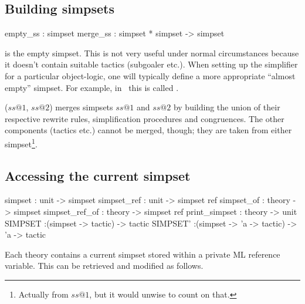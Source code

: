 \subsection{Building simpsets}
\begin{ttbox}
empty_ss : simpset
merge_ss : simpset * simpset -> simpset
\end{ttbox}
\begin{ttdescription}
  
\item[\ttindexbold{empty_ss}] is the empty simpset.  This is not very
  useful under normal circumstances because it doesn't contain
  suitable tactics (subgoaler etc.).  When setting up the simplifier
  for a particular object-logic, one will typically define a more
  appropriate ``almost empty'' simpset.  For example, in \HOL\ this is
  called .
  
\item[\ttindexbold{merge_ss} ($ss@1$, $ss@2$)] merges simpsets $ss@1$
  and $ss@2$ by building the union of their respective rewrite rules,
  simplification procedures and congruences.  The other components
  (tactics etc.) cannot be merged, though; they are taken from either
  simpset\footnote{Actually from $ss@1$, but it would unwise to count
    on that.}.

\end{ttdescription}


\subsection{Accessing the current simpset}
\label{sec:access-current-simpset}

\begin{ttbox}
simpset        : unit   -> simpset
simpset_ref    : unit   -> simpset ref
simpset_of     : theory -> simpset
simpset_ref_of : theory -> simpset ref
print_simpset  : theory -> unit
SIMPSET        :(simpset ->       tactic) ->       tactic
SIMPSET'       :(simpset -> 'a -> tactic) -> 'a -> tactic
\end{ttbox}

Each theory contains a current simpset stored
within a private ML reference variable.  This can be retrieved and
modified as follows.

